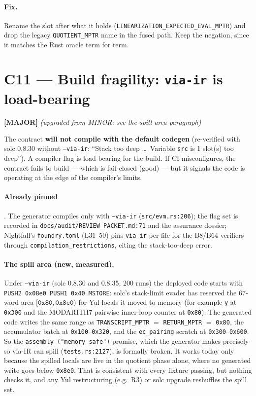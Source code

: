\paragraph{Fix.}
Rename the slot after what it holds
(\texttt{LINEARIZATION\_\allowbreak{}EXPECTED\_\allowbreak{}EVAL\_\allowbreak{}MPTR}) and drop the legacy
\texttt{QUOTIENT\_MPTR} name in the fused path. Keep the negation,
since it matches the Rust oracle term for term.

\section{C11 --- Build fragility: \texttt{via-ir} is load-bearing}
\label{sec:c11-build}
\textcolor{mathpurple}{\textbf{[MAJOR]}} 
\emph{(upgraded from MINOR: see the spill-area paragraph)}

The contract \textbf{will not compile with the default codegen}
(re-verified with solc 0.8.30 without \texttt{--via-ir}:
``Stack too deep \ldots\ Variable \texttt{src} is 1 slot(s) too
deep''). A compiler flag is load-bearing for the build.
If CI misconfigures, the contract fails to build --- which is
fail-closed (good) --- but it signals the code is operating at
the edge of the compiler's limits.

\paragraph{Already pinned} . The generator
compiles only with \texttt{--via-ir} (\texttt{src/evm.rs:206});
the flag set is recorded in
\texttt{docs/\allowbreak{}audit/\allowbreak{}REVIEW\_\allowbreak{}PACKET.md:71} and the assurance dossier;
Nightfall's \texttt{foundry.toml} (L31--50) pins \texttt{via\_ir}
per file for the B8/B64 verifiers through
\texttt{compilation\_\allowbreak{}restrictions}, citing the stack-too-deep error.

\paragraph{The spill area (new, measured).} Under
\texttt{--via-ir} (solc 0.8.30 and 0.8.35, 200 runs) the deployed
code starts with
\texttt{PUSH2 0x08e0 PUSH1 0x40 MSTORE}: solc's stack-limit evader
has reserved the 67-word area $[\texttt{0x80},\texttt{0x8e0})$ for Yul
locals it moved to memory (for example \texttt{y} at \texttt{0x300} and the
MODARITH7 pairwise inner-loop counter at \texttt{0x80}). The generated code writes
the same range as \texttt{TRANSCRIPT\_MPTR} $=$
\texttt{RETURN\_MPTR} $=$ \texttt{0x80}, the accumulator batch at
\texttt{0x100}--\texttt{0x320}, and the \texttt{ec\_pairing} scratch
at \texttt{0x300}--\texttt{0x600}. So the
\texttt{assembly ("memory-safe")} promise, which the generator makes
precisely so via-IR can spill (\texttt{tests.rs:2127}), is formally
broken. It works today only because the spilled locals are live
in the quotient phase alone, where no generated write goes below
\texttt{0x8e0}. That is consistent with every fixture passing, but
nothing checks it, and any Yul restructuring (e.g.\ R3) or solc
upgrade reshuffles the spill set.

